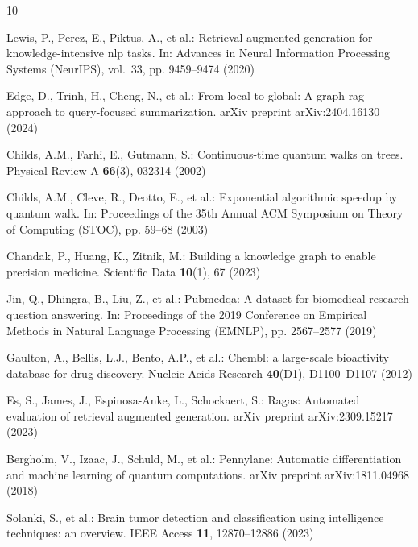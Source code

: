 \documentclass[runningheads]{llncs}
\begin{document}
\begin{thebibliography}{10}
\providecommand{\url}[1]{\texttt{#1}}
\providecommand{\urlprefix}{URL }
\providecommand{\doi}[1]{https://doi.org/#1}

Lewis, P., Perez, E., Piktus, A., et al.: Retrieval-augmented generation for knowledge-intensive nlp tasks. In: Advances in Neural Information Processing Systems (NeurIPS), vol.~33, pp. 9459--9474 (2020)

Edge, D., Trinh, H., Cheng, N., et al.: From local to global: A graph rag approach to query-focused summarization. arXiv preprint arXiv:2404.16130 (2024)

Childs, A.M., Farhi, E., Gutmann, S.: Continuous-time quantum walks on trees. Physical Review A \textbf{66}(3), 032314 (2002)

Childs, A.M., Cleve, R., Deotto, E., et al.: Exponential algorithmic speedup by quantum walk. In: Proceedings of the 35th Annual ACM Symposium on Theory of Computing (STOC), pp. 59--68 (2003)

Chandak, P., Huang, K., Zitnik, M.: Building a knowledge graph to enable precision medicine. Scientific Data \textbf{10}(1), 67 (2023)

Jin, Q., Dhingra, B., Liu, Z., et al.: Pubmedqa: A dataset for biomedical research question answering. In: Proceedings of the 2019 Conference on Empirical Methods in Natural Language Processing (EMNLP), pp. 2567--2577 (2019)

Gaulton, A., Bellis, L.J., Bento, A.P., et al.: Chembl: a large-scale bioactivity database for drug discovery. Nucleic Acids Research \textbf{40}(D1), D1100--D1107 (2012)

Es, S., James, J., Espinosa-Anke, L., Schockaert, S.: Ragas: Automated evaluation of retrieval augmented generation. arXiv preprint arXiv:2309.15217 (2023)

Bergholm, V., Izaac, J., Schuld, M., et al.: Pennylane: Automatic differentiation and machine learning of quantum computations. arXiv preprint arXiv:1811.04968 (2018)

Solanki, S., et al.: Brain tumor detection and classification using intelligence techniques: an overview. IEEE Access \textbf{11}, 12870--12886 (2023)

\end{thebibliography}
\end{document}
